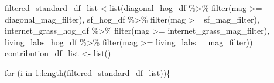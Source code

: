 \documentclass[
  letterpaper,
  DIV=11,
  numbers=noendperiod]{scrreprt}
\newenvironment{Shaded}{\begin{snugshade}}{\end{snugshade}}
\newcommand{\ControlFlowTok}[1]{\textcolor[rgb]{0.00,0.23,0.31}{#1}}
\newcommand{\DecValTok}[1]{\textcolor[rgb]{0.68,0.00,0.00}{#1}}
\newcommand{\FunctionTok}[1]{\textcolor[rgb]{0.28,0.35,0.67}{#1}}
\newcommand{\NormalTok}[1]{\textcolor[rgb]{0.00,0.23,0.31}{#1}}
\newcommand{\OtherTok}[1]{\textcolor[rgb]{0.00,0.23,0.31}{#1}}
\newcommand{\SpecialCharTok}[1]{\textcolor[rgb]{0.37,0.37,0.37}{#1}}
\begin{document}
\begin{Shaded}
\begin{Highlighting}[]
\NormalTok{filtered\_standard\_df\_list }\OtherTok{\textless{}{-}}\FunctionTok{list}\NormalTok{(diagonal\_hog\_df }\SpecialCharTok{\%\textgreater{}\%}
                                   \FunctionTok{filter}\NormalTok{(mag }\SpecialCharTok{\textgreater{}=}\NormalTok{ diagonal\_mag\_filter),}
\NormalTok{                                 sf\_hog\_df }\SpecialCharTok{\%\textgreater{}\%}
                                   \FunctionTok{filter}\NormalTok{(mag }\SpecialCharTok{\textgreater{}=}\NormalTok{ sf\_mag\_filter), }
\NormalTok{                                 internet\_grass\_hog\_df }\SpecialCharTok{\%\textgreater{}\%}
                                   \FunctionTok{filter}\NormalTok{(mag }\SpecialCharTok{\textgreater{}=}\NormalTok{ internet\_grass\_mag\_filter), }
\NormalTok{                                 living\_labs\_hog\_df }\SpecialCharTok{\%\textgreater{}\%}
                                   \FunctionTok{filter}\NormalTok{(mag }\SpecialCharTok{\textgreater{}=}\NormalTok{ living\_labs\_\_mag\_filter))}
\NormalTok{contribution\_df\_list }\OtherTok{\textless{}{-}} \FunctionTok{list}\NormalTok{()}

 
\ControlFlowTok{for}\NormalTok{ (i }\ControlFlowTok{in} \DecValTok{1}\SpecialCharTok{:}\FunctionTok{length}\NormalTok{(filtered\_standard\_df\_list))\{}
  

\end{Highlighting}
\end{Shaded}
\end{document}
